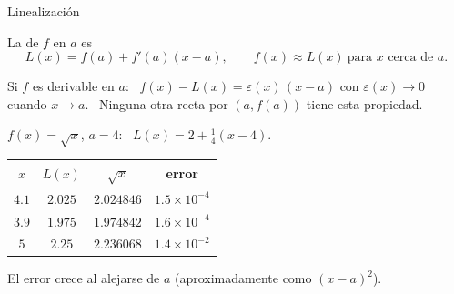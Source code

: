\documentclass[10pt,aspectratio=169]{beamer}
\begin{document}
\begin{frame}{Linealización}
  \small
  \begin{definicion}
    La  de $f$ en $a$ es
    \[ L(x)=f(a)+f'(a)(x-a),\qquad f(x)\approx L(x)\ \text{para } x\text{ cerca de } a. \]
  \end{definicion}
  \begin{teorema}
    Si $f$ es derivable en $a$: \ $f(x)-L(x)=\varepsilon(x)\,(x-a)$ con $\varepsilon(x)\to0$ cuando $x\to a$.
    \ Ninguna otra recta por $(a,f(a))$ tiene esta propiedad.
  \end{teorema}
  \begin{ejemplo}[1]
    $f(x)=\sqrt x$, $a=4$: \ $L(x)=2+\frac14(x-4)$.
    \begin{center}
      \begin{tabular}{c|c|c|c}
        $x$ & $L(x)$ & $\sqrt x$ & error\\ \hline
        $4.1$ & $2.025$ & $2.024846$ & $1.5\times10^{-4}$\\
        $3.9$ & $1.975$ & $1.974842$ & $1.6\times10^{-4}$\\
        $5$ & $2.25$ & $2.236068$ & $1.4\times10^{-2}$
      \end{tabular}
    \end{center}
    El error crece al alejarse de $a$ (aproximadamente como $(x-a)^2$).
  \end{ejemplo}
\end{frame}
\end{document}
